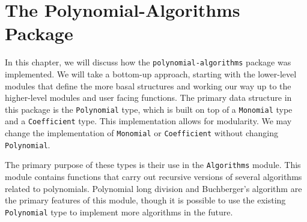 \documentclass[MS, xcolor=dvipsnames]{wfuthesis}
\theoremstyle{definition}
\begin{document}
\chapter{The Polynomial-Algorithms Package}
In this chapter, we will discuss how the \lstinline{polynomial-algorithms} package was implemented. We will take a bottom-up approach, starting with the lower-level modules that define the more basal structures and working our way up to the higher-level modules and user facing functions. The primary data structure in this package is the \lstinline{Polynomial} type, which is built on top of a \lstinline{Monomial} type and a \lstinline{Coefficient} type. This implementation allows for modularity. We may change the implementation of \lstinline{Monomial} or \lstinline{Coefficient} without changing \lstinline{Polynomial}. \par
The primary purpose of these types is their use in the \lstinline{Algorithms} module. This module contains functions that carry out recursive versions of several algorithms related to polynomials. Polynomial long division and Buchberger's algorithm are the primary features of this module, though it is possible to use the existing \lstinline{Polynomial} type to implement more algorithms in the future.

\end{document}
